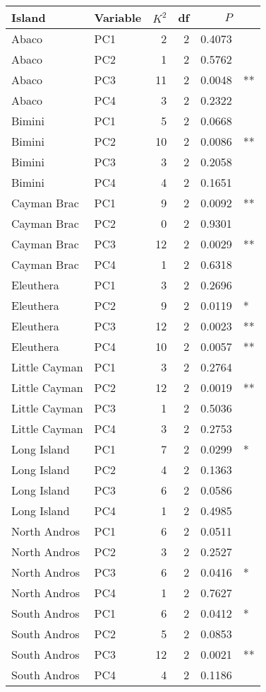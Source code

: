 
\begin{tabular}{llrrrl}
\toprule
Island & Variable & $K^2$ & df & $P$ & \\
\midrule
Abaco & PC1 & 2 & 2 & 0.4073 & \\
Abaco & PC2 & 1 & 2 & 0.5762 & \\
Abaco & PC3 & 11 & 2 & 0.0048 & **\\
Abaco & PC4 & 3 & 2 & 0.2322 & \\
Bimini & PC1 & 5 & 2 & 0.0668 & \\
Bimini & PC2 & 10 & 2 & 0.0086 & **\\
Bimini & PC3 & 3 & 2 & 0.2058 & \\
Bimini & PC4 & 4 & 2 & 0.1651 & \\
Cayman Brac & PC1 & 9 & 2 & 0.0092 & **\\
Cayman Brac & PC2 & 0 & 2 & 0.9301 & \\
Cayman Brac & PC3 & 12 & 2 & 0.0029 & **\\
Cayman Brac & PC4 & 1 & 2 & 0.6318 & \\
Eleuthera & PC1 & 3 & 2 & 0.2696 & \\
Eleuthera & PC2 & 9 & 2 & 0.0119 & *\\
Eleuthera & PC3 & 12 & 2 & 0.0023 & **\\
Eleuthera & PC4 & 10 & 2 & 0.0057 & **\\
Little Cayman & PC1 & 3 & 2 & 0.2764 & \\
Little Cayman & PC2 & 12 & 2 & 0.0019 & **\\
Little Cayman & PC3 & 1 & 2 & 0.5036 & \\
Little Cayman & PC4 & 3 & 2 & 0.2753 & \\
Long Island & PC1 & 7 & 2 & 0.0299 & *\\
Long Island & PC2 & 4 & 2 & 0.1363 & \\
Long Island & PC3 & 6 & 2 & 0.0586 & \\
Long Island & PC4 & 1 & 2 & 0.4985 & \\
North Andros & PC1 & 6 & 2 & 0.0511 & \\
North Andros & PC2 & 3 & 2 & 0.2527 & \\
North Andros & PC3 & 6 & 2 & 0.0416 & *\\
North Andros & PC4 & 1 & 2 & 0.7627 & \\
South Andros & PC1 & 6 & 2 & 0.0412 & *\\
South Andros & PC2 & 5 & 2 & 0.0853 & \\
South Andros & PC3 & 12 & 2 & 0.0021 & **\\
South Andros & PC4 & 4 & 2 & 0.1186 & \\
\bottomrule
\end{tabular}
